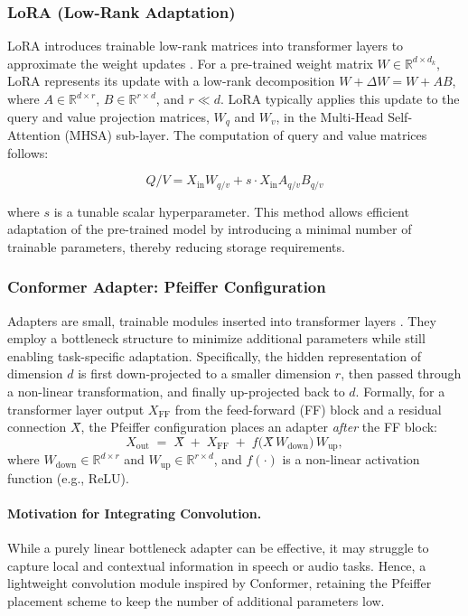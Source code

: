 \documentclass[11pt]{article}
\begin{document}
\subsubsection{LoRA (Low-Rank Adaptation)}
LoRA introduces trainable low-rank matrices into transformer layers to approximate the weight updates \cite{hu2021lora}. For a pre-trained weight matrix $W \in \mathbb{R}^{d \times d_k}$, LoRA represents its update with a low-rank decomposition $W + \Delta W = W + AB$, where $A \in \mathbb{R}^{d \times r}$, $B \in \mathbb{R}^{r \times d}$, and $r \ll d$. LoRA typically applies this update to the query and value projection matrices, $W_q$ and $W_v$, in the Multi-Head Self-Attention (MHSA) sub-layer. The computation of query and value matrices follows:

\begin{equation}
Q/V = X_{\text{in}} W_{q/v} + s \cdot X_{\text{in}} A_{q/v} B_{q/v}
\end{equation}

where $s$ is a tunable scalar hyperparameter. This method allows efficient adaptation of the pre-trained model by introducing a minimal number of trainable parameters, thereby reducing storage requirements.

\subsubsection{Conformer Adapter: Pfeiffer Configuration}
Adapters are small, trainable modules inserted into transformer layers \cite{he2021towards}. They employ a bottleneck structure to minimize additional parameters while still enabling task-specific adaptation. Specifically, the hidden representation of dimension $d$ is first down-projected to a smaller dimension $r$, then passed through a non-linear transformation, and finally up-projected back to $d$. Formally, for a transformer layer output $X_{\text{FF}}$ from the feed-forward (FF) block and a residual connection $X̂$, the Pfeiffer configuration places an adapter \emph{after} the FF block:
\begin{equation}
X_{\text{out}} \;=\; X̂ \;+\; X_{\text{FF}} \;+\; f\bigl(X̂\,W_{\text{down}}\bigr)\,W_{\text{up}},
\end{equation}
where $W_{\text{down}} \in \mathbb{R}^{d \times r}$ and $W_{\text{up}} \in \mathbb{R}^{r \times d}$, and $f(\cdot)$ is a non-linear activation function (e.g., ReLU). 

\paragraph{Motivation for Integrating Convolution.}
While a purely linear bottleneck adapter can be effective, it may struggle to capture local and contextual information in speech or audio tasks. Hence, a lightweight convolution module inspired by Conformer, retaining the Pfeiffer placement scheme to keep the number of additional parameters low.
\end{document}

